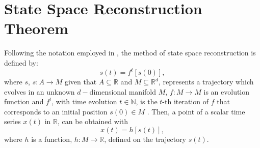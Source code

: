 \section{State Space Reconstruction Theorem} \label{sec:rss}
Following the notation employed in \cite{casdagli1991, garland2016, 
gibson1992, uzal2011, uzal2010, takens1981}, the method of state space 
reconstruction is defined by:
\begin{equation}\label{eq:ssr}
  s(t)=f^t [s(0)],
\end{equation}
where $s$, $s: A \rightarrow M$ given that $A \subseteq \mathbb{R}$ and $M 
\subseteq \mathbb{R}^d$, represents a trajectory which evolves in an 
unknown $d-$dimensional manifold $M$, $f: M \rightarrow M$ is an evolution 
function and $f^t$, with time evolution $t \in \mathbb{N}$, is the $t$-th 
iteration of $f$ that corresponds to an initial position $s(0) \in M $ 
\citep{takens1981}.
Then, a point of a scalar time series $x(t)$ in $\mathbb{R}$, can be obtained 
with
\begin{equation}\label{eq:measurement}
	x(t)=h[s(t)],
\end{equation}
where $h$ is a function, $h: M \rightarrow \mathbb{R}$, defined on the 
trajectory $s(t)$.

